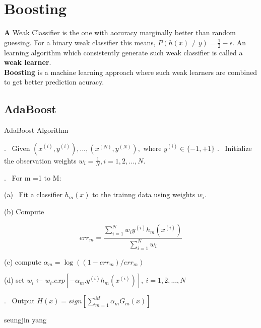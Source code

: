 \documentclass[12pt]{article}
\begin{document}
 \section{Boosting}
 \textbf A {Weak Classifier} is the one with accuracy marginally better than random guessing. For a binary  weak classifier this means, $P(h(x) \neq y) = \frac{1}{2} - \epsilon .$ An learning algorithm which consistently generate such weak classifier is called a \textbf{weak learner}.\\ \textbf{Boosting} is a machine learning approach where such weak learners are combined to get better prediction acuracy.\\



 \subsection{AdaBoost}
 
 
 \begin{algorithm}
 	
 	\caption*{AdaBoost Algorithm} \label{alg:MyAlgorithm}
 	\begin{algorithmic}
 		
 		. \ Given $(x^{(i)},y^{(i)}),...,(x^{(N)},y^{(N)}),$ where $y^{(i)}\in \{-1,+1\}$ 
 		. \  Initialize the observation weights $w_{i}= \frac{1}{N},i = 1,2,...,N.$
 		
 		. \ For m =1 to M:
 		
 		
 		
 		\STATE \hspace{ 0.8cm}(a) \ Fit a classifier $h_{m}(x)$ to the trainng data using weights $w_{i}.$
 		
 		\STATE \hspace{ 0.8cm}(b) Compute 
 		
 	
 		
 			$$err_{m} = \frac{\sum_{i=1}^{N}w_{i}y^{(i)}h_{m}(x^{(i)})}{\sum_{i=1}^{N} w_{i}}$$
 		
 		
 		
 			\STATE \hspace{ 0.8cm}(c) compute $\alpha_{m} = \log((1-err_{m})/err_{m})$
 			
 				\STATE \hspace{ 0.8cm}(d) set $w_{i} \leftarrow w_{i}.exp[-\alpha_{m}.y^{(i)}h_{m}(x^{(i)})], \ i = 1,2,...,N$
 				
 	. \ Output $H(x) = sign[\sum_{m=1}^{M}\alpha_{m}G_{m}(x)]$
 		
 		
 	\end{algorithmic}
 \end{algorithm}seungjin yang 
 
\end{document}
